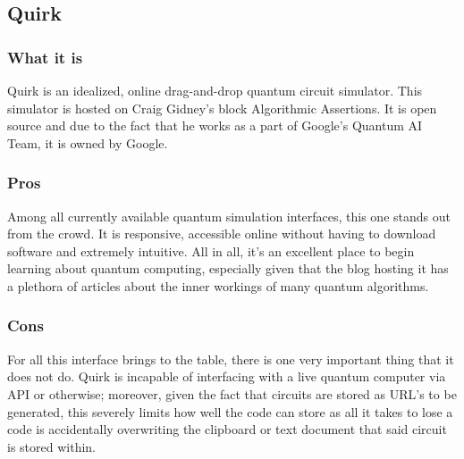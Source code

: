 \documentclass[a4paper]{article}
\begin{document}
\label{QISKit}


\subsection{Quirk}%
\subsubsection{What it is}
Quirk is an idealized, online drag-and-drop quantum circuit simulator. This simulator is hosted on Craig Gidney's block Algorithmic Assertions\cite{algoassert}.  It is open source and due to the fact that he works as a part of Google's Quantum AI Team, it is owned by Google.
\subsubsection{Pros}%
Among all currently available quantum simulation interfaces, this one stands out from the crowd.  It is responsive, accessible online without having to download software and extremely intuitive.  All in all, it's an excellent place to begin learning about quantum computing, especially given that the blog hosting it has a plethora of articles about the inner workings of many quantum algorithms.
\subsubsection{Cons}%
For all this interface brings to the table, there is one very important thing that it does not do.  Quirk is incapable of interfacing with a live quantum computer via API or otherwise; moreover, given the fact that circuits are stored as URL's to be generated, this severely limits how well the code can store as all it takes to lose a code is accidentally overwriting the clipboard or text document that said circuit is stored within.
\end{document}
